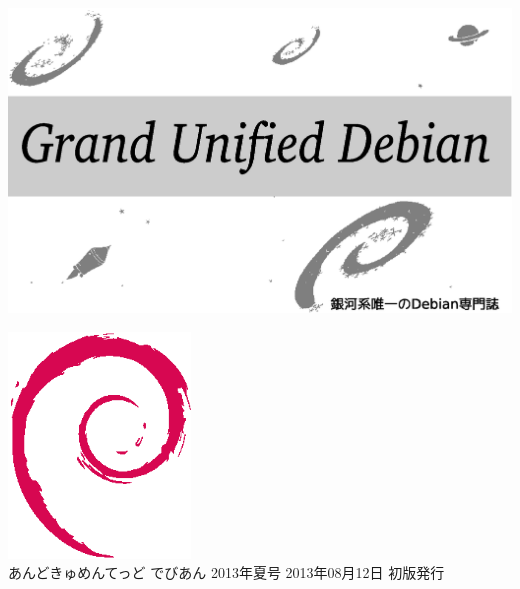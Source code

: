 \documentclass[mingoth,a4paper]{jsarticle}
\begin{document}
\begin{titlepage}
\thispagestyle{empty}

\hspace*{-2.5cm}
\includegraphics{image2012-natsu/gudeb.eps}\\
\vspace*{0.1cm}

\vspace*{2cm}

\vspace*{-1.5cm}
\hspace*{11cm}\includegraphics[height=6cm]{image200502/openlogo-nd.eps}\\
\vspace*{0.1cm}
\hfill あんどきゅめんてっど でびあん 2013年夏号 2013年08月12日 初版発行
\end{titlepage}

\newpage
\thispagestyle{empty}\mbox{}
\newpage
\end{document}
